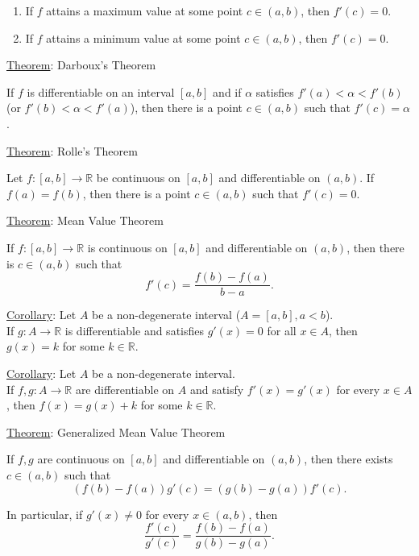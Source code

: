 \documentclass[12pt]{article}
\newcommand{\RR}{\mathbb{R}} %
\begin{document}
\begin{enumerate}
\item If $f$ attains a maximum value at some point $c \in (a, b)$, then $f'(c) = 0$.

\item If $f$ attains a minimum value at some point $c \in (a, b)$, then $f'(c) = 0$.
\end{enumerate}

\hrulefill

\underline{Theorem}: Darboux's Theorem

If $f$ is differentiable on an interval $[a, b]$ and if $\alpha$ satisfies $f'(a) < \alpha < f'(b)$
\\
(or $f'(b) < \alpha < f'(a)$), then there is a point $c \in (a, b)$ such that $f'(c) = \alpha$.

\hrulefill

\underline{Theorem}: Rolle's Theorem

Let $f : [a, b] \rightarrow \RR$ be continuous on $[a, b]$ and differentiable on $(a, b)$. If $f(a) = f(b)$, then there is a point $c \in (a, b)$ such that $f'(c) = 0$.

\pagebreak

\underline{Theorem}: Mean Value Theorem

If $f : [a, b] \rightarrow \RR$ is continuous on $[a, b]$ and differentiable on $(a, b)$, then there is $c \in (a, b)$ such that
\[
f'(c) = \frac{f(b) - f(a)}{b - a}.
\]

\hrulefill

\underline{Corollary}: Let $A$ be a non-degenerate interval ($A = [a, b], a < b$).
\\
If $g : A \rightarrow \RR$ is differentiable and satisfies $g'(x) = 0$ for all $x \in A$, then $g(x) = k$ for some $k \in \RR$.

\hrulefill

\underline{Corollary}: Let $A$ be a non-degenerate interval.
\\
If $f, g : A \rightarrow \RR$ are differentiable on $A$ and satisfy $f'(x) = g'(x)$ for every $x \in A$, then $f(x) = g(x) + k$ for some $k \in \RR$.

\hrulefill

\underline{Theorem}: Generalized Mean Value Theorem

If $f, g$ are continuous on $[a, b]$ and differentiable on $(a, b)$, then there exists $c \in (a, b)$ such that
\[
(f(b) - f(a)) g'(c) = (g(b) - g(a)) f'(c).
\]

In particular, if $g'(x) \ne 0$ for every $x \in (a, b)$, then
\[
\frac{f'(c)}{g'(c)} = \frac{f(b) - f(a)}{g(b) - g(a)}.
\]
\end{document}
